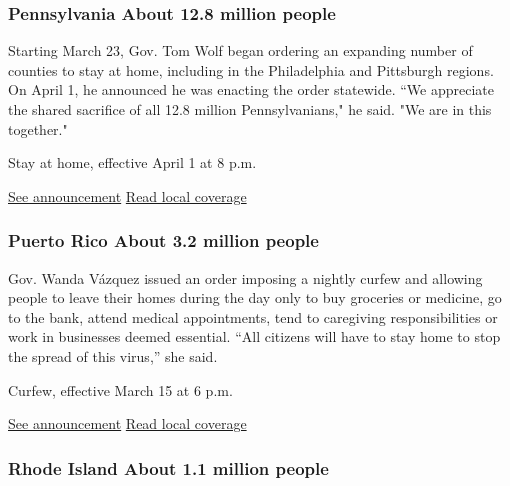 \hypertarget{pennsylvania-about-128-million-people}{%
\subsubsection{Pennsylvania About 12.8 million
people}\label{pennsylvania-about-128-million-people}}

Starting March 23, Gov. Tom Wolf began ordering an expanding number of
counties to stay at home, including in the Philadelphia and Pittsburgh
regions. On April 1, he announced he was enacting the order statewide.
``We appreciate the shared sacrifice of all 12.8 million
Pennsylvanians," he said. "We are in this together."

Stay at home, effective April 1 at 8 p.m.

\href{https://www.governor.pa.gov/wp-content/uploads/2020/04/20200401-GOV-Statewide-Stay-at-Home-Order.pdf}{See
announcement} \textbar{}
\href{https://www.inquirer.com/news/pennsylvania/spl/pennsylvania-pa-coronavirus-stay-at-home-order-statewide-20200401.html}{Read
local coverage}

\hypertarget{puerto-rico-about-32-million-people}{%
\subsubsection{Puerto Rico About 3.2 million
people}\label{puerto-rico-about-32-million-people}}

Gov. Wanda Vázquez issued an order imposing a nightly curfew and
allowing people to leave their homes during the day only to buy
groceries or medicine, go to the bank, attend medical appointments, tend
to caregiving responsibilities or work in businesses deemed essential.
``All citizens will have to stay home to stop the spread of this
virus,'' she said.

Curfew, effective March 15 at 6 p.m.

\href{https://www.scribd.com/document/451785912/Orden-ejecutiva-de-la-gobernadora-para-combatir-el-coronavirus\#from_embed}{See
announcement} \textbar{}
\href{https://www.elnuevodia.com/noticias/locales/nota/wandavazquezdecretatoquedequedaparatodopuertoricoparacontenerelcoronavirus-2552934/}{Read
local coverage}

\hypertarget{rhode-island-about-11-million-people}{%
\subsubsection{Rhode Island About 1.1 million
people}\label{rhode-island-about-11-million-people}}

